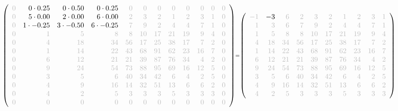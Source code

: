 \documentclass[11pt]{article}
\begin{document}
    
    \[\scriptstyle \def\g{\color{lightgray}}\left(\begin{array}{rrrrrrrrrrrr}\g{0} & 0\cdot 0.25 & 0\cdot 0.50 & 0\cdot 0.25 & \g{0} & \g{0} & \g{0} & \g{0} & \g{0} & \g{0} & \g{0} & \g{0}\\\g{0} & 5\cdot 0.00 & 2\cdot 0.00 & 6\cdot 0.00 & \g{2} & \g{3} & \g{2} & \g{1} & \g{2} & \g{3} & \g{1} & \g{0}\\\g{0} & 1\cdot -0.25 & 3\cdot -0.50 & 6\cdot -0.25 & \g{7} & \g{9} & \g{2} & \g{4} & \g{4} & \g{7} & \g{1} & \g{0}\\\g{0} & \g{1} & \g{5} & \g{8} & \g{8} & \g{10} & \g{17} & \g{21} & \g{19} & \g{9} & \g{4} & \g{0}\\\g{0} & \g{4} & \g{18} & \g{34} & \g{56} & \g{17} & \g{25} & \g{38} & \g{17} & \g{7} & \g{2} & \g{0}\\\g{0} & \g{1} & \g{14} & \g{22} & \g{43} & \g{68} & \g{91} & \g{62} & \g{23} & \g{16} & \g{7} & \g{0}\\\g{0} & \g{6} & \g{12} & \g{21} & \g{21} & \g{39} & \g{87} & \g{76} & \g{34} & \g{4} & \g{2} & \g{0}\\\g{0} & \g{9} & \g{24} & \g{54} & \g{73} & \g{88} & \g{95} & \g{69} & \g{16} & \g{12} & \g{5} & \g{0}\\\g{0} & \g{3} & \g{5} & \g{6} & \g{40} & \g{34} & \g{42} & \g{6} & \g{4} & \g{2} & \g{5} & \g{0}\\\g{0} & \g{4} & \g{9} & \g{16} & \g{14} & \g{32} & \g{51} & \g{13} & \g{6} & \g{6} & \g{2} & \g{0}\\\g{0} & \g{4} & \g{2} & \g{5} & \g{3} & \g{3} & \g{3} & \g{5} & \g{3} & \g{3} & \g{3} & \g{0}\\\g{0} & \g{0} & \g{0} & \g{0} & \g{0} & \g{0} & \g{0} & \g{0} & \g{0} & \g{0} & \g{0} & \g{0}\end{array}\right)=\left(\begin{array}{rrrrrrrrrrrr}\g{-1} & -3 & \g{6} & \g{2} & \g{3} & \g{2} & \g{1} & \g{2} & \g{3} & \g{1}\\\g{1} & \g{3} & \g{6} & \g{7} & \g{9} & \g{2} & \g{4} & \g{4} & \g{7} & \g{1}\\\g{1} & \g{5} & \g{8} & \g{8} & \g{10} & \g{17} & \g{21} & \g{19} & \g{9} & \g{4}\\\g{4} & \g{18} & \g{34} & \g{56} & \g{17} & \g{25} & \g{38} & \g{17} & \g{7} & \g{2}\\\g{1} & \g{14} & \g{22} & \g{43} & \g{68} & \g{91} & \g{62} & \g{23} & \g{16} & \g{7}\\\g{6} & \g{12} & \g{21} & \g{21} & \g{39} & \g{87} & \g{76} & \g{34} & \g{4} & \g{2}\\\g{9} & \g{24} & \g{54} & \g{73} & \g{88} & \g{95} & \g{69} & \g{16} & \g{12} & \g{5}\\\g{3} & \g{5} & \g{6} & \g{40} & \g{34} & \g{42} & \g{6} & \g{4} & \g{2} & \g{5}\\\g{4} & \g{9} & \g{16} & \g{14} & \g{32} & \g{51} & \g{13} & \g{6} & \g{6} & \g{2}\\\g{4} & \g{2} & \g{5} & \g{3} & \g{3} & \g{3} & \g{5} & \g{3} & \g{3} & \g{3}\end{array}\right)\]
\end{document}
